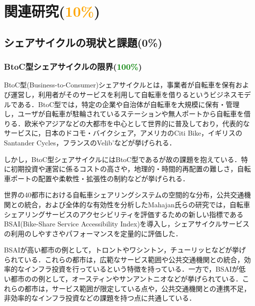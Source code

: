 \section{関連研究(\textcolor{orange}{10\%})}
  \label{sec:関連研究}
    \par
  
  \subsection{シェアサイクルの現状と課題(0\%)}
    \label{sec:シェアサイクルの現状と課題}
      
      \subsubsection{BtoC型シェアサイクルの限界(\textcolor{green}{100\%})}
        \label{sec:BtoC型シェアサイクルの限界}
          \par BtoC型(Business-to-Consumer)シェアサイクルとは，事業者が自転車を保有および運営し，利用者がそのサービスを利用して自転車を借りるというビジネスモデルである．BtoC型では，特定の企業や自治体が自転車を大規模に保有・管理し，ユーザが自転車が駐輪されているステーションや無人ポートから自転車を借りる．欧米やアジアなどの大都市を中心として世界的に普及しており，代表的なサービスに，日本のドコモ・バイクシェア，アメリカのCiti Bike，イギリスのSantander Cycles，フランスのVelib’などが挙げられる．
          \par しかし，BtoC型シェアサイクルにはBtoC型であるが故の課題を抱えている．特に初期投資や運営に係るコストの高さや，地理的・時間的再配置の難しさ，自転車ポートの配置や柔軟性・拡張性の制約などが挙げられる．
          \par 世界の40都市における自転車シェアリングシステムの空間的な分布，公共交通機関との統合，および全体的な有効性を分析したMahajan氏らの研究では，自転車シェアリングサービスのアクセシビリティを評価するための新しい指標であるBSAI(Bike-Share Service Accessibility Index)を導入し，シェアサイクルサービスの利用のしやすさやパフォーマンスを定量的に評価した．
          \par BSAIが高い都市の例として，トロントやワシントン，チューリッヒなどが挙げられている．これらの都市は，広範なサービス範囲や公共交通機関との統合，効率的なインフラ投資を行っているという特徴を持っている．一方で，BSAIが低い都市のの例として，オースティンやサンアントニオなどが挙げられている．これらの都市は，サービス範囲が限定している点や，公共交通機関との連携不足，非効率的なインフラ投資などの課題を持つ点に共通している．
